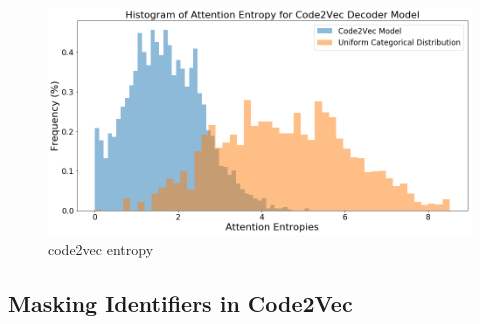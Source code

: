 \begin{figure}
\begin{center}
\includegraphics[width=0.8\linewidth]{ImagesCodeRelated/code2vec_entropies.png}
\end{center}
\caption{code2vec entropy}
\label{fig:entropy_code2vec}
\end{figure}







\subsection{Masking Identifiers in Code2Vec} %
\label{sub:comparing_code2vec_altered}

